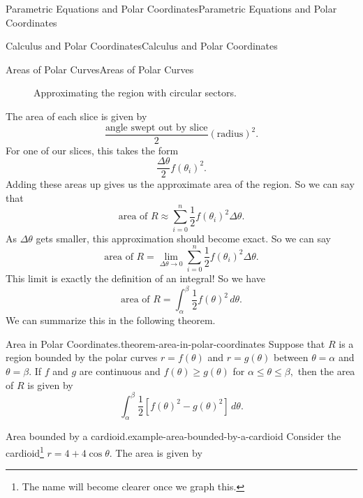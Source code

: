 \documentclass[10pt,]{book}
\numberwithin{equation}{section}
\begin{document}
\begin{chapterptx}{Parametric Equations and Polar Coordinates}{}{Parametric Equations and Polar Coordinates}{}{}
\begin{sectionptx}{Calculus and Polar Coordinates}{}{Calculus and Polar Coordinates}{}{}
\begin{subsectionptx}{Areas of Polar Curves}{}{Areas of Polar Curves}{}{}
\begin{figure}
{
}
\caption{Approximating the region with circular sectors.\label{figure-polar-region-1}}
\end{figure}
\hypertarget{p-824}{}%
The area of each slice is given by%
%
\begin{equation*}
\frac{\text{angle swept out by slice}}{2}(\text{radius})^{2}.
\end{equation*}
\hypertarget{p-825}{}%
For one of our slices, this takes the form%
%
\begin{equation*}
\frac{\Delta\theta}{2}f(\theta_{i})^{2}.
\end{equation*}
\hypertarget{p-826}{}%
Adding these areas up gives us the approximate area of the region. So we can say that%
%
\begin{equation*}
\text{area of }R \approx \sum_{i=0}^{n}\frac{1}{2}f(\theta_{i})^{2}\Delta\theta.
\end{equation*}
\hypertarget{p-827}{}%
As \(\Delta\theta\) gets smaller, this approximation should become exact. So we can say%
%
\begin{equation*}
\text{area of }R = \lim_{\Delta\theta\to0}\sum_{i=0}^{n}\frac{1}{2}f(\theta_{i})^{2}\Delta\theta.
\end{equation*}
\hypertarget{p-828}{}%
This limit is exactly the definition of an integral! So we have%
%
\begin{equation*}
\text{area of }R = \int_{\alpha}^{\beta}\frac{1}{2}f(\theta)^{2}\,d\theta.
\end{equation*}
\hypertarget{p-829}{}%
We can summarize this in the following theorem.%
\begin{theorem}{Area in Polar Coordinates.}{}{theorem-area-in-polar-coordinates}%
\hypertarget{p-830}{}%
Suppose that \(R\) is a region bounded by the polar curves \(r=f(\theta)\) and \(r=g(\theta)\) between \(\theta = \alpha\) and \(\theta=\beta\). If \(f\) and \(g\) are continuous and \(f(\theta)\geq g(\theta)\) for \(\alpha\leq\theta\leq\beta,\) then the area of \(R\) is given by%
\begin{equation*}
\int_{\alpha}^{\beta}\frac{1}{2}[f(\theta)^{2}-g(\theta)^{2}]\,d\theta.
\end{equation*}
%
\end{theorem}
\begin{example}{Area bounded by a cardioid.}{example-area-bounded-by-a-cardioid}%
\hypertarget{p-831}{}%
Consider the cardioid\footnote{The name will become clearer once we graph this.\label{fn-1}} \(r = 4+4\cos\theta\). The area is given by%

\end{example}
\end{subsectionptx}
\end{sectionptx}
\end{chapterptx}
\end{document}
